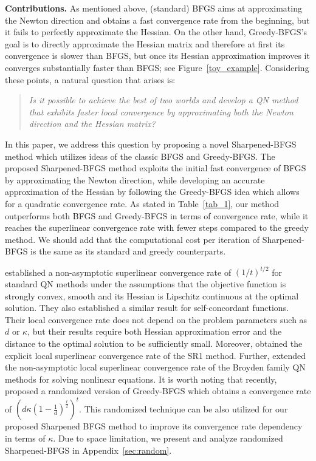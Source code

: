 \documentclass[11pt]{article}
\numberwithin{assumption}{section}
\numberwithin{remark}{section}
\numberwithin{theorem}{section}
\begin{document}
\textbf{Contributions.} As mentioned above, (standard) BFGS aims at approximating the Newton direction and obtains a fast convergence rate from the beginning, but it fails to perfectly approximate the Hessian. On the other hand, Greedy-BFGS's goal is to directly approximate the Hessian matrix and therefore at first its convergence is slower than BFGS, but once its Hessian approximation improves it converges substantially faster than BFGS; see Figure~\ref{toy_example}. Considering these points, a natural question that arises is:

\vspace{-2mm}
\begin{quote}
\textit{Is it possible to achieve the best of two worlds and develop a QN method that  exhibits faster local convergence by approximating both the Newton direction and the Hessian matrix?}    
\end{quote}
\vspace{-2mm}

In this paper, we address this question by proposing a novel Sharpened-BFGS method which utilizes ideas of the classic BFGS and Greedy-BFGS. The proposed Sharpened-BFGS method exploits the initial fast convergence of BFGS by approximating the Newton direction, while developing an accurate approximation of the Hessian by following the Greedy-BFGS idea which allows for a quadratic convergence rate. As stated in Table~\ref{tab_1}, our method outperforms both BFGS and Greedy-BFGS in terms of convergence rate, while it reaches the superlinear convergence rate with fewer steps compared to the greedy method. We should add that the computational cost per iteration of Sharpened-BFGS is the same as its standard and greedy counterparts.

 \citet{qiujiang2020quasinewton1} established a non-asymptotic superlinear convergence rate of $({1}/{t})^{t/2}$ for standard QN methods under the assumptions that the objective function is strongly convex, smooth and its Hessian is Lipschitz continuous at the optimal solution. They also established a similar result for self-concordant functions. Their local convergence rate does not depend on the problem parameters such as $d$ or $\kappa$, but their results require both Hessian approximation error and the distance to the optimal solution to be sufficiently small. Moreover, \citet{zhangzhihua2021quasinewton1} obtained the explicit local superlinear convergence rate of the SR1 method. Further, \citet{zhangzhihua2021quasinewton2} extended the non-asymptotic local superlinear convergence rate of the Broyden family QN methods for solving nonlinear equations. It is worth noting that recently, \citet{zhangzhihua2021quasinewton3} proposed a randomized version of Greedy-BFGS which obtains a convergence rate of $(d\kappa(1 \!-\! \frac{1}{d})^{\frac{t}{2}})^{t}$. This randomized technique can be also utilized for our proposed Sharpened BFGS method to improve its convergence rate dependency in terms of $\kappa$. Due to space limitation, we present and analyze randomized Sharpened-BFGS in Appendix~\ref{sec:random}. 
\end{document}
